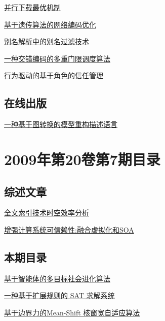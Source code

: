 \documentclass[a4paper]{article}
\begin{document}
\href{http://www.jos.org.cn/ch/reader/download_pdf.aspx?file_no=3386&year_id=2009&quarter_id=8&falg=1}{并行下载最优机制}

\href{http://www.jos.org.cn/ch/reader/download_pdf.aspx?file_no=3370&year_id=2009&quarter_id=8&falg=1}{基于遗传算法的网络编码优化}

\href{http://www.jos.org.cn/ch/reader/download_pdf.aspx?file_no=3398&year_id=2009&quarter_id=8&falg=1}{别名解析中的别名过滤技术}

\href{http://www.jos.org.cn/ch/reader/download_pdf.aspx?file_no=3327&year_id=2009&quarter_id=8&falg=1}{一种交错编码的多重门限调度算法}

\href{http://www.jos.org.cn/ch/reader/download_pdf.aspx?file_no=3300&year_id=2009&quarter_id=8&falg=1}{行为驱动的基于角色的信任管理}

\subsection{在线出版}
\href{http://www.jos.org.cn/ch/reader/download_pdf.aspx?file_no=3469&year_id=2009&quarter_id=8&falg=1}{一种基于图转换的模型重构描述语言}


\section{\textbf{2009年第20卷第7期目录}}
\subsection{综述文章}
\href{http://www.jos.org.cn/ch/reader/download_pdf.aspx?file_no=3500&year_id=2009&quarter_id=7&falg=1}{全文索引技术时空效率分析}

\href{http://www.jos.org.cn/ch/reader/download_pdf.aspx?file_no=3549&year_id=2009&quarter_id=7&falg=1}{增强计算系统可信赖性:融合虚拟化和SOA}

\subsection{本期目录}
\href{http://www.jos.org.cn/ch/reader/download_pdf.aspx?file_no=3336&year_id=2009&quarter_id=7&falg=1}{基于智能体的多目标社会进化算法}

\href{http://www.jos.org.cn/ch/reader/download_pdf.aspx?file_no=3320&year_id=2009&quarter_id=7&falg=1}{一种基于扩展规则的 SAT 求解系统}

\href{http://www.jos.org.cn/ch/reader/download_pdf.aspx?file_no=3315&year_id=2009&quarter_id=7&falg=1}{基于边界力的Mean-Shift 核窗宽自适应算法}
\end{document}
